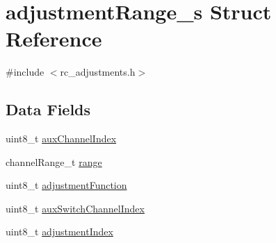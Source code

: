 \hypertarget{structadjustmentRange__s}{\section{adjustment\+Range\+\_\+s Struct Reference}
\label{structadjustmentRange__s}
}


{\ttfamily \#include $<$rc\+\_\+adjustments.\+h$>$}

\subsection*{Data Fields}
\begin{DoxyCompactItemize}
\item 
uint8\+\_\+t \hyperlink{structadjustmentRange__s_a5d212927ed80dc14968ad1d2b2467194}{aux\+Channel\+Index}
\item 
channel\+Range\+\_\+t \hyperlink{structadjustmentRange__s_a763e7fd821d77f0080781ea2ce6c7214}{range}
\item 
uint8\+\_\+t \hyperlink{structadjustmentRange__s_a30729c55c2a53bebef197cf6a7eb3ed1}{adjustment\+Function}
\item 
uint8\+\_\+t \hyperlink{structadjustmentRange__s_a8fe7fe6475972d4f299af01edef7be6e}{aux\+Switch\+Channel\+Index}
\item 
uint8\+\_\+t \hyperlink{structadjustmentRange__s_a8e3f033736377d8ece8c2ff8e672a175}{adjustment\+Index}
\end{DoxyCompactItemize}


